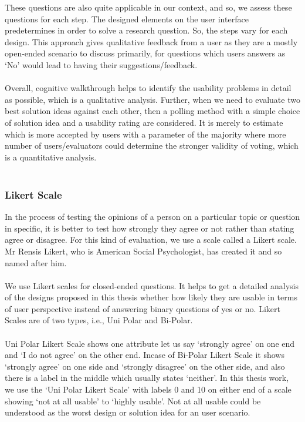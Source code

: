 These questions are also quite applicable in our context, and so, we assess these questions for each step. The designed elements on the user interface predetermines in order to solve a research question. So, the steps vary for each design. This approach gives qualitative feedback from a user as they are a mostly open-ended scenario to discuss primarily, for questions which users answers as ‘No’ would lead to having their suggestions/feedback. \\ \\

Overall, cognitive walkthrough helps to identify the usability problems in detail as possible, which is a qualitative analysis. Further, when we need to evaluate two best solution ideas against each other, then a polling method with a simple choice of solution idea and a usability rating are considered. It is merely to estimate which is more accepted by users with a parameter of the majority where more number of users/evaluators could determine the stronger validity of voting, which is a quantitative analysis. \\ \\

\clearpage

\subsubsection{Likert Scale}

In the process of testing the opinions of a person on a particular topic or question in specific, it is better to test how strongly they agree or not rather than stating agree or disagree. For this kind of evaluation, we use a scale called a Likert scale. \cite{likert} Mr Rensis Likert, who is American Social Psychologist, has created it and so named after him. \\ \\

We use Likert scales for closed-ended questions. It helps to get a detailed analysis of the designs proposed in this thesis whether how likely they are usable in terms of user perspective instead of answering binary questions of yes or no. Likert Scales are of two types, i.e., Uni Polar and Bi-Polar. \\ \\

Uni Polar Likert Scale shows one attribute let us say ‘strongly agree’ on one end and ‘I do not agree’ on the other end. Incase of Bi-Polar Likert Scale it shows ‘strongly agree’ on one side and ‘strongly disagree’ on the other side, and also there is a label in the middle which usually states ‘neither’. In this thesis work, we use the ‘Uni Polar Likert Scale’ with labels 0 and 10 on either end of a scale showing ‘not at all usable’ to ‘highly usable’. Not at all usable could be understood as the worst design or solution idea for an user scenario.\\ \\

